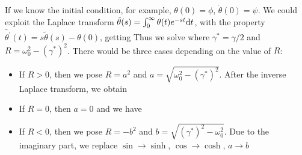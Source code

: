 \documentclass[article,11pt]{elegantpaper}
\begin{document}
If we know the initial condition, for example, $\theta(0) = \phi$, $\dot\theta(0) = \psi$. We could exploit the Laplace transform $\tilde\theta(s) = \int_0^\infty \theta(t) e^{-st} \mathrm{d}t$, with the property $\widetilde{\theta^\prime}(t) = s\tilde\theta(s) - \theta(0)$, getting
Thus we solve %
where $\gamma^\ast = \gamma/2$ and $R = \omega_0^2 - (\gamma^\ast)^2$. There would be three cases depending on the value of $R$:
\begin{itemize}
  \item If $R>0$, then we pose $R=a^2$ and $a=\sqrt{\omega_0^2 - (\gamma^\ast)^2}$. After the inverse Laplace transform, we obtain 
  
  \item If $R=0$, then $a=0$ and we have
  
  \item If $R<0$, then we pose $R=-b^2$ and $b = \sqrt{(\gamma^\ast)^2 - \omega_0^2}$. Due to the imaginary part, we replace $\sin \to \sinh$, $\cos \to \cosh$, $a \to b$
\end{itemize}
\end{document}
